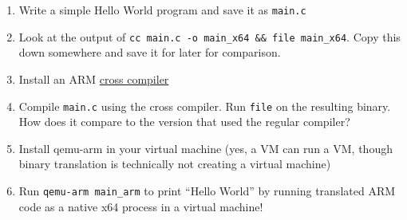 \documentclass{article}
\begin{document}
\begin{enumerate}
  \item Write a simple Hello World program and save it as \texttt{main.c}
  \item Look at the output of \texttt{cc main.c -o main\_x64 \&\& file main\_x64}.
    Copy this down somewhere and save it for later for comparison.
  \item Install an ARM \href{https://en.wikipedia.org/wiki/Cross_compiler}{cross compiler}
  \item Compile \texttt{main.c} using the cross compiler. Run \texttt{file} on
    the resulting binary. How does it compare to the version that used the
    regular compiler?
  \item Install qemu-arm in your virtual machine (yes, a VM can run a VM,
    though binary translation is technically not creating a virtual machine)
  \item Run \texttt{qemu-arm main\_arm} to print ``Hello World'' by running
    translated ARM code as a native x64 process in a virtual machine!
\end{enumerate}
\end{document}
